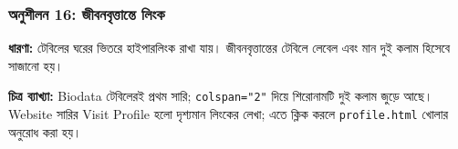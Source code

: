 \par\noindent\subsubsection{অনুশীলন 16: জীবনবৃত্তান্তে লিংক}\par\smallskip\textbf{ধারণা:}
টেবিলের ঘরের ভিতরে হাইপারলিংক রাখা যায়। জীবনবৃত্তান্তের টেবিলে লেবেল এবং মান দুই কলাম হিসেবে সাজানো হয়।


\noindent
\textbf{চিত্র ব্যাখ্যা:} 
Biodata টেবিলেরই প্রথম সারি; \texttt{colspan="2"} দিয়ে শিরোনামটি দুই কলাম জুড়ে আছে। Website সারির Visit Profile হলো দৃশ্যমান লিংকের লেখা; এতে ক্লিক করলে \texttt{profile.html} খোলার অনুরোধ করা হয়।





